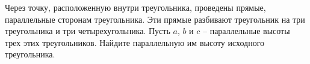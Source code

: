\begin{ex}
	\begin{condition}
		Через точку, расположенную внутри треугольника,	проведены прямые, параллельные сторонам треугольника. Эти прямые разбивают треугольник на три треугольника и три четырехугольника. Пусть \( a \), \( b  \) и \( c \) – параллельные высоты трех этих треугольников. Найдите параллельную им высоту исходного треугольника.
	\end{condition}
\end{ex}